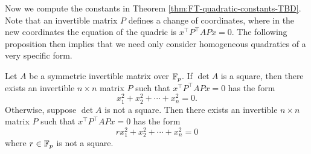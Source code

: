 Now we compute the constants in Theorem \ref{thm:FT-quadratic-constants-TBD}. Note that an invertible matrix $P$ defines a change of coordinates, where in the new coordinates the equation of the quadric is $x^\top P^\top A P x = 0$. The following proposition then implies that we need only consider homogeneous quadratics of a very specific form.
\begin{prop}\label{prop:diag-to-two-forms}
	Let $A$ be a symmetric invertible matrix over $\mathbb{F}_p$. If $\det A$ is a square, then there exists an invertible $n\times n$ matrix $P$ such that $x^\top P^\top A P x = 0$ has the form
	\begin{equation}
	x_1^2 + x_2^2 + \cdots + x_n^2 = 0. \tag{Q1}\label{eq:Q1}
	\end{equation}
	Otherwise, suppose $\det A$ is not a square. Then there exists an invertible $n\times n$ matrix $P$ such that $x^\top P^\top A P x = 0$ has the form
	\begin{equation}
	rx_1^2 + x_2^2 + \cdots + x_n^2 = 0 \tag{Q2}\label{eq:Q2}
	\end{equation}
	where $r \in \mathbb{F}_p$ is not a square.
\end{prop}
